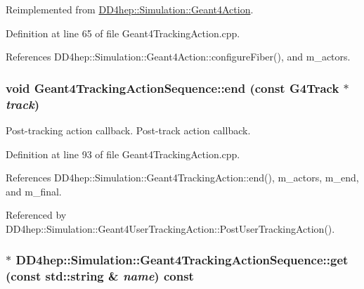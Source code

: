 Reimplemented from \hyperlink{class_d_d4hep_1_1_simulation_1_1_geant4_action_a6adc7138508303e4e417cb48a737ab19}{DD4hep::Simulation::Geant4Action}.

Definition at line 65 of file Geant4TrackingAction.cpp.

References DD4hep::Simulation::Geant4Action::configureFiber(), and m\_\-actors.\hypertarget{class_d_d4hep_1_1_simulation_1_1_geant4_tracking_action_sequence_aeed70df4aa406595a03464436c52dce0}{
\subsubsection[{end}]{\setlength{\rightskip}{0pt plus 5cm}void Geant4TrackingActionSequence::end (const G4Track $\ast$ {\em track})}}
\label{class_d_d4hep_1_1_simulation_1_1_geant4_tracking_action_sequence_aeed70df4aa406595a03464436c52dce0}


Post-\/tracking action callback. Post-\/track action callback. 

Definition at line 93 of file Geant4TrackingAction.cpp.

References DD4hep::Simulation::Geant4TrackingAction::end(), m\_\-actors, m\_\-end, and m\_\-final.

Referenced by DD4hep::Simulation::Geant4UserTrackingAction::PostUserTrackingAction().\hypertarget{class_d_d4hep_1_1_simulation_1_1_geant4_tracking_action_sequence_a484e57a9aabe9c6a8ededabbb633ba2d}{
\subsubsection[{get}]{$\ast$ DD4hep::Simulation::Geant4TrackingActionSequence::get (const std::string \& {\em name}) const}}
\label{class_d_d4hep_1_1_simulation_1_1_geant4_tracking_action_sequence_a484e57a9aabe9c6a8ededabbb633ba2d}


